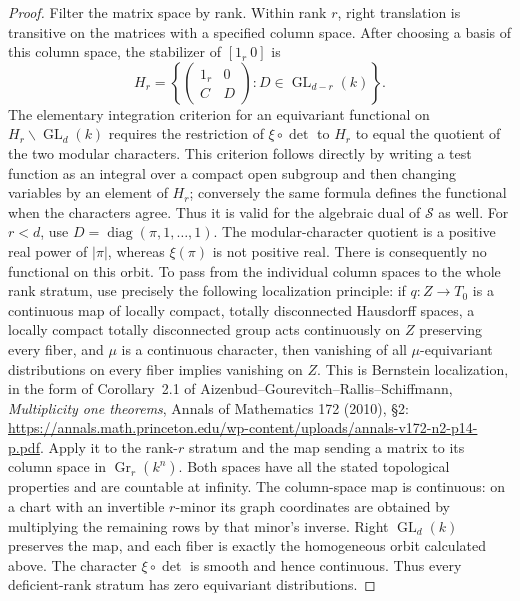 \begin{proof}
Filter the matrix space by rank. Within rank \(r\), right
translation is transitive on the matrices with a specified
column space. After choosing a basis of this column space,
the stabilizer of \([1_r\ 0]\) is
\[
       H_r=\left\{\begin{pmatrix}1_r&0\\ C&D\end{pmatrix}
                     :D\in\operatorname{GL}_{d-r}(k)\right\}.
\]
The elementary integration criterion for an equivariant
functional on \(H_r\backslash\operatorname{GL}_d(k)\)
requires the restriction of \(\xi\circ\det\) to \(H_r\)
to equal the quotient of the two modular characters.
This criterion follows directly by writing a test function
as an integral over a compact open subgroup and then changing
variables by an element of \(H_r\); conversely the same formula
defines the functional when the characters agree. Thus it is
valid for the algebraic dual of \(\mathcal S\) as well.
For \(r<d\), use \(D=\operatorname{diag}(\pi,1,\ldots,1)\).
The modular-character quotient is a positive real power of
\(|\pi|\), whereas \(\xi(\pi)\) is not positive real.
There is consequently no functional on this orbit.
To pass from the individual column spaces to the whole rank
stratum, use precisely the following localization principle:
if \(q:Z\to T_0\) is a continuous map of locally compact,
totally disconnected Hausdorff spaces, a locally compact
totally disconnected group acts continuously on \(Z\)
preserving every fiber, and \(\mu\) is a continuous character,
then vanishing of all \(\mu\)-equivariant distributions on
every fiber implies vanishing on \(Z\).
This is Bernstein localization, in the form of Corollary~2.1
of Aizenbud--Gourevitch--Rallis--Schiffmann,
\emph{Multiplicity one theorems}, Annals of Mathematics
172 (2010), \S2:
\url{https://annals.math.princeton.edu/wp-content/uploads/annals-v172-n2-p14-p.pdf}.
Apply it to the rank-\(r\) stratum and the map sending a
matrix to its column space in
\(\operatorname{Gr}_r(k^n)\). Both spaces have all the stated
topological properties and are countable at infinity.
The column-space map is continuous: on a chart with an
invertible \(r\)-minor its graph coordinates are obtained
by multiplying the remaining rows by that minor's inverse.
Right \(\operatorname{GL}_d(k)\) preserves the map, and
each fiber is exactly the homogeneous orbit calculated
above. The character \(\xi\circ\det\) is smooth and hence
continuous. Thus every deficient-rank stratum has zero
equivariant distributions.


\end{proof}
